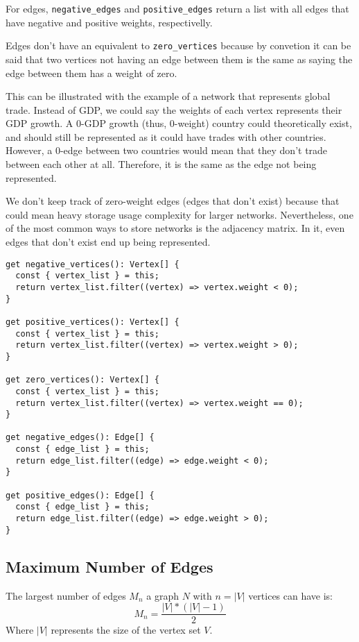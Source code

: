For edges, \texttt{negative_edges} and \texttt{positive_edges}
return a list with all edges that have negative and positive weights, respectivelly.

Edges don't have an equivalent to \texttt{zero_vertices}
because by convetion it can be said that two vertices not having
an edge between them is the same as saying the edge between
them has a weight of zero.

This can be illustrated with the example of a network that represents global trade.
Instead of GDP, we could say the weights of each vertex represents their
GDP growth.
A 0-GDP growth (thus, 0-weight) country could theoretically exist,
and should still be represented as it could have trades with other countries.
However, a 0-edge between two countries would mean that they don't
trade between each other at all.
Therefore, it is the same as the edge not being represented.

We don't keep track of zero-weight edges (edges that don't exist)
because that could mean heavy storage usage complexity for larger networks.
Nevertheless, one of the most common ways to store networks is the
adjacency matrix. In it, even edges that don't exist end up being represented.

\begin{verbatim}
get negative_vertices(): Vertex[] {
  const { vertex_list } = this;
  return vertex_list.filter((vertex) => vertex.weight < 0);
}

get positive_vertices(): Vertex[] {
  const { vertex_list } = this;
  return vertex_list.filter((vertex) => vertex.weight > 0);
}

get zero_vertices(): Vertex[] {
  const { vertex_list } = this;
  return vertex_list.filter((vertex) => vertex.weight == 0);
}

get negative_edges(): Edge[] {
  const { edge_list } = this;
  return edge_list.filter((edge) => edge.weight < 0);
}

get positive_edges(): Edge[] {
  const { edge_list } = this;
  return edge_list.filter((edge) => edge.weight > 0);
}
\end{verbatim}

\subsection{Maximum Number of Edges}

The largest number of edges $M_n$ a graph $N$ with $n=|V|$ vertices can have is:
$$M_n=\frac{|V|*(|V|-1)}{2}$$
Where $|V|$ represents the size of the vertex set $V$.

